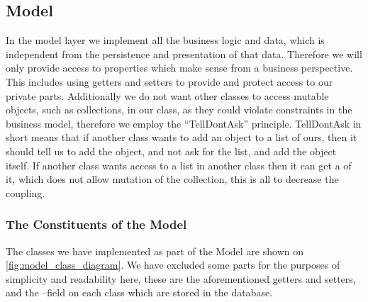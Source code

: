 \subsection{Model}

In the model layer we implement all the business logic and data, which is independent from the persistence and presentation of that data. 
Therefore we will only provide access to properties which make sense from a business perspective.
This includes using getters and setters to provide and protect access to our private parts. %
Additionally we do not want other classes to access mutable objects, such as collections, in our class, as they could violate constraints in the business model, therefore we employ the ``TellDontAsk'' principle\cite{Fowler_TellDontAsk}.
TellDontAsk in short means that if another class wants to add an object to a list of ours, then it should tell us to add the object, and not ask for the list, and add the object itself. 
If another class wants access to a list in another class then it can get a  of it, which does not allow mutation of the collection, this is all to decrease the coupling.

\subsubsection*{The Constituents of the Model}
The classes we have implemented as part of the Model are shown on \cref{fig:model_class_diagram}.
We have excluded some parts for the purposes of simplicity and readability here, these are the aforementioned getters and setters, and the --field on each class which are stored in the database. 

